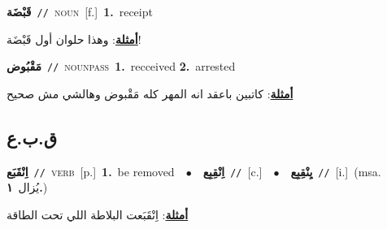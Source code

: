 \documentclass[10pt,a4paper,twoside]{article} %
\begin{document}
\begin{multicols}{2}
{\setlength\topsep{0pt}\textbf{\foreignlanguage{arabic}{قَبْضَة}}\ {\color{gray}\texttt{//}\color{black}}\ \textsc{noun}\ [f.]\ \textbf{1.}~receipt\  \begin{flushright}\color{gray}\foreignlanguage{arabic}{\textbf{\underline{\foreignlanguage{arabic}{أمثلة}}}: وهذا حلوان أول قَبْضَة!}\end{flushright}\color{black}} \vspace{2mm}

{\setlength\topsep{0pt}\textbf{\foreignlanguage{arabic}{مَقْبُوض}}\ {\color{gray}\texttt{//}\color{black}}\ \textsc{noun\textunderscore pass}\ \textbf{1.}~recceived  \textbf{2.}~arrested\  \begin{flushright}\color{gray}\foreignlanguage{arabic}{\textbf{\underline{\foreignlanguage{arabic}{أمثلة}}}: كاتبين باعقد انه المهر كله مَقْبوض وهالشي مش صحيح}\end{flushright}\color{black}} \vspace{2mm}

\vspace{-3mm}
\subsection*{\color{blue}\foreignlanguage{arabic}{ق.ب.ع}\color{blue}{}} 

{\setlength\topsep{0pt}\textbf{\foreignlanguage{arabic}{اِنْقَبَع}}\ {\color{gray}\texttt{//}\color{black}}\ \textsc{verb}\ [p.]\ \textbf{1.}~be removed\ \ $\bullet$\ \ \setlength\topsep{0pt}\textbf{\foreignlanguage{arabic}{اِنْقِبِع}}\ {\color{gray}\texttt{//}\color{black}}\ [c.]\ \ $\bullet$\ \ \setlength\topsep{0pt}\textbf{\foreignlanguage{arabic}{يِنْقِبِع}}\ {\color{gray}\texttt{//}\color{black}}\ [i.]\ \color{gray}(msa. \foreignlanguage{arabic}{يُزال}~\foreignlanguage{arabic}{\textbf{١.}})\color{black}\  \begin{flushright}\color{gray}\foreignlanguage{arabic}{\textbf{\underline{\foreignlanguage{arabic}{أمثلة}}}: اِنْقَبَعت البلاطة اللي تحت الطاقة}\end{flushright}\color{black}} \vspace{2mm}


\end{multicols}
\end{document}

